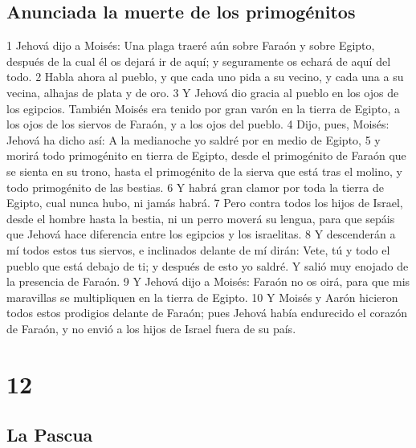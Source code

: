 \section*{Anunciada la muerte de los primogénitos}

1 Jehová dijo a Moisés: Una plaga traeré aún sobre Faraón y sobre Egipto, después de la cual él os dejará ir de aquí; y seguramente os echará de aquí del todo.
2 Habla ahora al pueblo, y que cada uno pida a su vecino, y cada una a su vecina, alhajas de plata y de oro.
3 Y Jehová dio gracia al pueblo en los ojos de los egipcios. También Moisés era tenido por gran varón en la tierra de Egipto, a los ojos de los siervos de Faraón, y a los ojos del pueblo.
4 Dijo, pues, Moisés: Jehová ha dicho así: A la medianoche yo saldré por en medio de Egipto,
5 y morirá todo primogénito en tierra de Egipto, desde el primogénito de Faraón que se sienta en su trono, hasta el primogénito de la sierva que está tras el molino, y todo primogénito de las bestias.
6 Y habrá gran clamor por toda la tierra de Egipto, cual nunca hubo, ni jamás habrá.
7 Pero contra todos los hijos de Israel, desde el hombre hasta la bestia, ni un perro moverá su lengua, para que sepáis que Jehová hace diferencia entre los egipcios y los israelitas.
8 Y descenderán a mí todos estos tus siervos, e inclinados delante de mí dirán: Vete, tú y todo el pueblo que está debajo de ti; y después de esto yo saldré. Y salió muy enojado de la presencia de Faraón.
9 Y Jehová dijo a Moisés: Faraón no os oirá, para que mis maravillas se multipliquen en la tierra de Egipto.
10 Y Moisés y Aarón hicieron todos estos prodigios delante de Faraón; pues Jehová había endurecido el corazón de Faraón, y no envió a los hijos de Israel fuera de su país.

\chapter{12}

\section*{La Pascua}


